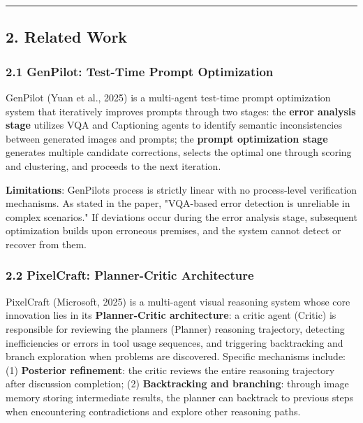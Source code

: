 \documentclass[
]{article}
\begin{document}
\begin{center}\rule{0.5\linewidth}{0.5pt}\end{center}

\subsection{2. Related Work}\label{2-related-work}

\subsubsection{2.1 GenPilot: Test-Time Prompt
Optimization}\label{21-genpilot-test-time-prompt-optimization}

GenPilot (Yuan et al., 2025) is a multi-agent test-time prompt
optimization system that iteratively improves prompts through two
stages: the \textbf{error analysis stage} utilizes VQA and Captioning
agents to identify semantic inconsistencies between generated images and
prompts; the \textbf{prompt optimization stage} generates multiple
candidate corrections, selects the optimal one through scoring and
clustering, and proceeds to the next iteration.

\textbf{Limitations}: GenPilot\textquotesingle s process is strictly
linear with no process-level verification mechanisms. As stated in the
paper, "VQA-based error detection is unreliable in complex scenarios."
If deviations occur during the error analysis stage, subsequent
optimization builds upon erroneous premises, and the system cannot
detect or recover from them.

\subsubsection{2.2 PixelCraft: Planner-Critic
Architecture}\label{22-pixelcraft-planner-critic-architecture}

PixelCraft (Microsoft, 2025) is a multi-agent visual reasoning system
whose core innovation lies in its \textbf{Planner-Critic architecture}:
a critic agent (Critic) is responsible for reviewing the
planner\textquotesingle s (Planner) reasoning trajectory, detecting
inefficiencies or errors in tool usage sequences, and triggering
backtracking and branch exploration when problems are discovered.
Specific mechanisms include: (1) \textbf{Posterior refinement}: the
critic reviews the entire reasoning trajectory after discussion
completion; (2) \textbf{Backtracking and branching}: through image
memory storing intermediate results, the planner can backtrack to
previous steps when encountering contradictions and explore other
reasoning paths.
\end{document}
